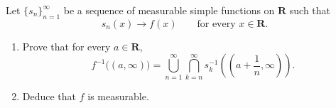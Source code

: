 \begin{problem}
    Let \(\{s_n\}_{n=1}^\infty\) be a sequence of measurable simple functions on \(\mathbf{R}\) such that
    \[
    s_n(x)\to f(x)\qquad \text{for every }x\in \mathbf{R}.
    \]
    \begin{enumerate}
        \item[(a)] Prove that for every \(a\in \mathbf{R}\),
        \[
        f^{-1}\bigl((a,\infty)\bigr)
        =
        \bigcup_{n=1}^\infty \bigcap_{k=n}^\infty
        s_k^{-1}\!\left(\left(a+\frac1n,\infty\right)\right).
        \]
        
        \item[(b)] Deduce that \(f\) is measurable.
    \end{enumerate}
\end{problem}

